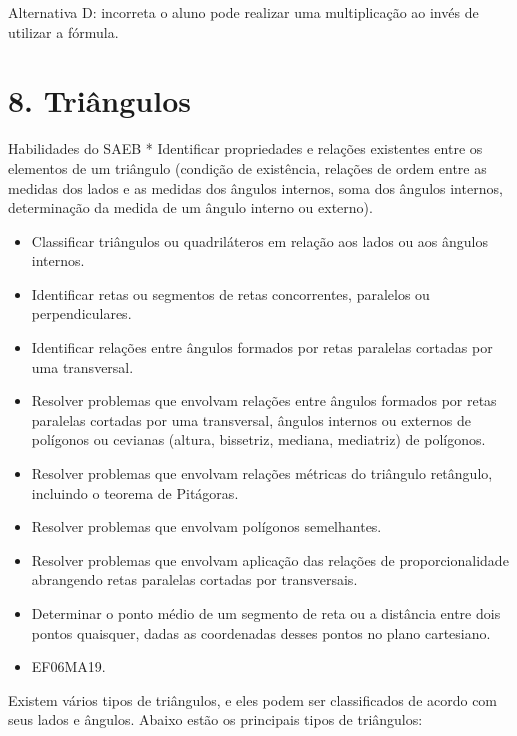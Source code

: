 Alternativa D: incorreta o aluno pode realizar uma multiplicação ao
invés de utilizar a fórmula.

\chapter{8. Triângulos}

Habilidades do SAEB * Identificar propriedades e relações existentes
entre os elementos de um triângulo (condição de existência, relações de
ordem entre as medidas dos lados e as medidas dos ângulos internos, soma
dos ângulos internos, determinação da medida de um ângulo interno ou
externo).

\begin{itemize}
\item
  Classificar triângulos ou quadriláteros em relação aos lados ou aos
  ângulos internos.
\item
  Identificar retas ou segmentos de retas concorrentes, paralelos ou
  perpendiculares.
\item
  Identificar relações entre ângulos formados por retas paralelas
  cortadas por uma transversal.
\item
  Resolver problemas que envolvam relações entre ângulos formados por
  retas paralelas cortadas por uma transversal, ângulos internos ou
  externos de polígonos ou cevianas (altura, bissetriz, mediana,
  mediatriz) de polígonos.
\item
  Resolver problemas que envolvam relações métricas do triângulo
  retângulo, incluindo o teorema de Pitágoras.
\item
  Resolver problemas que envolvam polígonos semelhantes.
\item
  Resolver problemas que envolvam aplicação das relações de
  proporcionalidade abrangendo retas paralelas cortadas por
  transversais.
\item
  Determinar o ponto médio de um segmento de reta ou a distância entre
  dois pontos quaisquer, dadas as coordenadas desses pontos no plano
  cartesiano.
\end{itemize}


\begin{itemize}
\item EF06MA19.
\end{itemize}

Existem vários tipos de triângulos, e eles podem ser classificados de
acordo com seus lados e ângulos. Abaixo estão os principais tipos de
triângulos:

